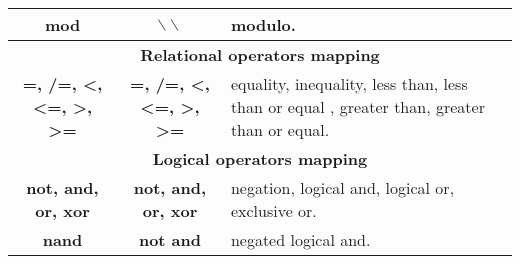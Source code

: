 \begin{center}
\begin{tabular}{| c | c | l |}
\begin{minipage}[c]{2.4cm} 
\centering 
\smallskip
\textbf{mod}
\smallskip
\end{minipage}  
        &
\begin{minipage}[c]{4.6cm}
\centering
\smallskip 
$\backslash\backslash$
\smallskip
\end{minipage}  
& 
\begin{minipage}[c]{6cm}  
\smallskip
 modulo.
\smallskip
\end{minipage} \\ \hline

\multicolumn{3}{|c|}{\textbf{Relational operators mapping}}\\ \hline

\begin{minipage}[c]{2.4cm} 
\centering
\smallskip 
\textbf{=, /=, \textless, \textless=, \textgreater, \textgreater=}
\smallskip
\end{minipage}  
&
\begin{minipage}[c]{4.6cm}
\centering 
\smallskip
\textbf{=, /=, \textless, \textless=, \textgreater, \textgreater=}
\smallskip
\end{minipage}  
& 
\begin{minipage}[c]{6cm} 
\smallskip
equality, inequality, less than, less than or equal , 
greater than, greater than or equal.
\smallskip
\end{minipage}\\ \hline
        
\multicolumn{3}{|c|}{\textbf{Logical operators mapping}}\\ \hline

\begin{minipage}[c]{2.4cm} 
\centering
\smallskip 
\textbf{not, and, or, xor}
\smallskip
\end{minipage}  
&
\begin{minipage}[c]{4.6cm}
\centering
\smallskip 
\textbf{not, and, or, xor}
\smallskip
\end{minipage}  
& 
\begin{minipage}[c]{6cm} 
\smallskip
negation, logical and, logical or, exclusive or.
\smallskip 
\end{minipage}\\ \hline


\begin{minipage}[c]{2.4cm} 
\centering 
\smallskip
\textbf{nand}
\smallskip
\end{minipage}  
&
\begin{minipage}[c]{4.6cm}
\centering 
\smallskip
\textbf{not and}
\smallskip
\end{minipage}  
& 
\begin{minipage}[c]{6cm} 
\smallskip
negated logical and.
\smallskip
\end{minipage}\\ \hline
	

\end{tabular}
\end{center}
